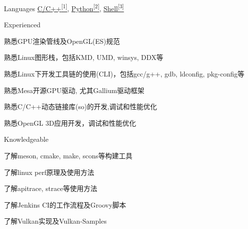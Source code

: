 
\begin{cvskills}
  \cvskill
    {Languages} %
    {\hyperlink{cpp-proj}{C/C++\textsuperscript{[1]}}, \hyperlink{python-proj}{Python\textsuperscript{[2]}}, \hyperlink{shell-proj}{Shell\textsuperscript{[3]}}} %
\end{cvskills}

\begin{cventries}
  \cventry
    {} %
    {Experienced} %
    {} %
    {} %
    {
      \begin{cvitems} %
        \item {熟悉GPU渲染管线及OpenGL(ES)规范}
        \item {熟悉Linux图形栈，包括KMD, UMD, winsys, DDX等}
        \item {熟悉Linux下开发工具链的使用(CLI)，包括gcc/g++, gdb, ldconfig, pkg-config等}
        \item {熟悉Mesa开源GPU驱动, 尤其Gallium驱动框架}
        \item {熟悉C/C++动态链接库(so)的开发,调试和性能优化}
        \item {熟悉OpenGL 3D应用开发，调试和性能优化}
      \end{cvitems}
    }
  \cventry
    {} %
    {Knowledgeable} %
    {} %
    {} %
    {
      \begin{cvitems} %
        \item {了解meson, cmake, make, scons等构建工具}
        \item {了解linux perf原理及使用方法}
        \item {了解apitrace, strace等使用方法}
        \item {了解Jenkins CI的工作流程及Groovy脚本}
        \item {了解Vulkan实现及Vulkan-Samples}
      \end{cvitems}
    }
\end{cventries}
